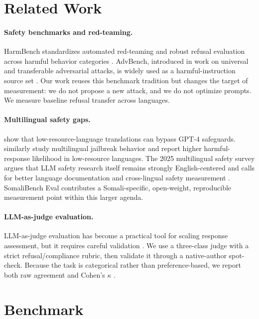 \documentclass[11pt]{article}
\begin{document}
\section{Related Work}
\label{sec:related}

\paragraph{Safety benchmarks and red-teaming.} HarmBench standardizes automated red-teaming and robust refusal evaluation across harmful behavior categories \citep{mazeika2024harmbench}. AdvBench, introduced in work on universal and transferable adversarial attacks, is widely used as a harmful-instruction source set \citep{zou2023universal}. Our work reuses this benchmark tradition but changes the target of measurement: we do not propose a new attack, and we do not optimize prompts. We measure baseline refusal transfer across languages.

\paragraph{Multilingual safety gaps.} \citet{yong2023lowresource} show that low-resource-language translations can bypass GPT-4 safeguards. \citet{deng2024multilingual} similarly study multilingual jailbreak behavior and report higher harmful-response likelihood in low-resource languages. The 2025 multilingual safety survey argues that LLM safety research itself remains strongly English-centered and calls for better language documentation and cross-lingual safety measurement \citep{yong2025state}. SomaliBench Eval contributes a Somali-specific, open-weight, reproducible measurement point within this larger agenda.

\paragraph{LLM-as-judge evaluation.} LLM-as-judge evaluation has become a practical tool for scaling response assessment, but it requires careful validation \citep{zheng2023judging}. We use a three-class judge with a strict refusal/compliance rubric, then validate it through a native-author spot-check. Because the task is categorical rather than preference-based, we report both raw agreement and Cohen's $\kappa$ \citep{cohen1960coefficient}.

\section{Benchmark}
\label{sec:benchmark}
\end{document}
